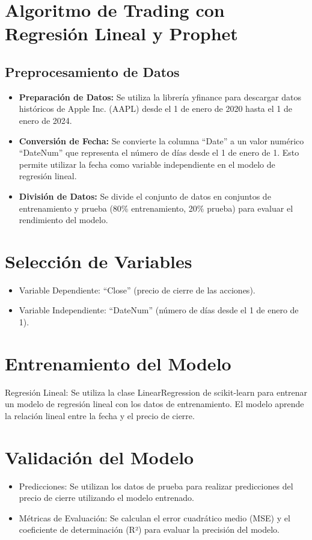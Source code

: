 \section{Algoritmo de Trading con Regresión Lineal y Prophet}
\subsection{Preprocesamiento de Datos}
\begin{itemize}
    \item \textbf{Preparación de Datos:} Se utiliza la librería yfinance para descargar datos históricos de Apple Inc. (AAPL) desde el 1 de enero de 2020 hasta el 1 de enero de 2024.
    \item \textbf{Conversión de Fecha:} Se convierte la columna “Date” a un valor numérico “DateNum” que representa el número de días desde el 1 de enero de 1. Esto permite utilizar la fecha como variable independiente en el modelo de regresión lineal.
    \item \textbf{División de Datos:} Se divide el conjunto de datos en conjuntos de entrenamiento y prueba (80\% entrenamiento, 20\% prueba) para evaluar el rendimiento del modelo.
\end{itemize}
\section{Selección de Variables}
\label{sec:seleccion_variables}
\begin{itemize}
    \item Variable Dependiente: “Close” (precio de cierre de las acciones).
    \item Variable Independiente: “DateNum” (número de días desde el 1 de enero de 1).
\end{itemize}
 
\section{Entrenamiento del Modelo}
\label{sec:entrenamiento_modelo}
Regresión Lineal: Se utiliza la clase LinearRegression de scikit-learn para entrenar un modelo de regresión lineal con los datos de entrenamiento. El modelo aprende la relación lineal entre la fecha y el precio de cierre.


\section{Validación del Modelo}
\label{sec:validacion_modelo}
\begin{itemize}
    \item Predicciones: Se utilizan los datos de prueba para realizar predicciones del precio de cierre utilizando el modelo entrenado.
    \item Métricas de Evaluación: Se calculan el error cuadrático medio (MSE) y el coeficiente de determinación (R²) para evaluar la precisión del modelo.
\end{itemize}

